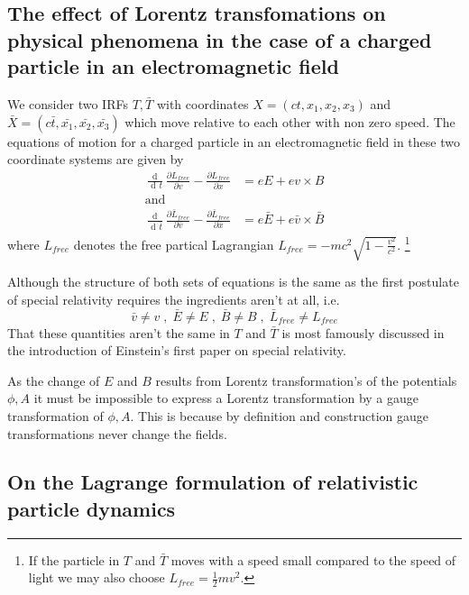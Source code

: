 \documentclass{article}
\DeclareMathOperator{\dd}{d\!}
\begin{document}
\subsection{The effect of Lorentz transfomations on physical phenomena in the case of a charged particle in an electromagnetic field}

We consider two IRFs $T, \bar{T}$ with coordinates $X=(ct, x_1, x_2, x_3)$ and $\bar{X}=(c \bar{t}, \bar{x_1}, \bar{x_2}, \bar{x_3})$ which move relative to each other with non zero speed.
The equations of motion for a charged particle in an electromagnetic field in these two coordinate systems are given by
\begin{align}
  \frac{\dd}{\dd t} \frac{\partial L_{free}}{\partial v} - \frac{\partial L_{free}}{\partial x} &= e E + e v \times B \\
  \text{and} \nonumber \\
  \frac{\dd}{\dd \bar{t}} \frac{\partial \bar{L}_{free}}{\partial \bar{v}} - \frac{\partial \bar{L}_{free}}{\partial \bar{x}} &= e \bar{E} + e \bar{v} \times \bar{B}
\end{align}
where $L_{free}$ denotes the free partical Lagrangian $L_{free} = - m c^2 \sqrt{1 - \frac{v^2}{c^2}}$.
\footnote{If the particle in $T$ and $\bar{T}$ moves with a speed small compared to the speed of light we may also choose $L_{free} = \frac{1}{2} m v^2$.}

Although the structure of both sets of equations is the same as the first postulate of special relativity requires the ingredients aren't at all, i.e.
\begin{equation}
  \bar{v} \neq v \;,\; \bar{E} \neq E \;,\; \bar{B} \neq B \;,\; \bar{L}_{free} \neq L_{free}
\end{equation}
That these quantities aren't the same in $T$ and $\bar{T}$ is most famously discussed in the introduction of Einstein's first paper on special relativity\cite{EinsteinSpecialRelativity}.

As the change of $E$ and $B$ results from Lorentz transformation's of the potentials $\phi, A$ it must be impossible to express a Lorentz transformation by a gauge transformation of $\phi, A$.
This is because by definition and construction gauge transformations never change the fields.

\subsection{On the Lagrange formulation of relativistic particle dynamics} \label{sectionOnRelativisticParticles}
\end{document}
